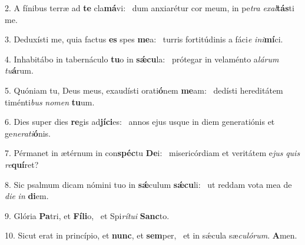 2. A fínibus terræ ad \textbf{te} cla\textbf{má}vi: \ast\  dum anxiarétur cor meum, in pe\textit{tra} \textit{ex}\textit{al}\textbf{tás}ti me.\

3. Deduxísti me, quia factus \textbf{es} spes \textbf{me}a: \ast\  turris fortitúdinis a fáci\textit{e} \textit{in}\textit{i}\textbf{mí}ci.\

4. Inhabitábo in tabernáculo \textbf{tu}o in \textbf{sǽ}\textbf{cu}la: \ast\  prótegar in velaménto a\textit{lá}\textit{rum} \textit{tu}\textbf{á}rum.\

5. Quóniam tu, Deus meus, exaudísti orati\textbf{ó}nem \textbf{me}am: \ast\  dedísti hereditátem timénti\textit{bus} \textit{no}\textit{men} \textbf{tu}um.\

6. Dies super dies \textbf{re}gis ad\textbf{jí}\textbf{ci}es: \ast\  annos ejus usque in diem generatiónis et ge\textit{ne}\textit{ra}\textit{ti}\textbf{ó}nis.\

7. Pérmanet in ætérnum in con\textbf{spéc}tu \textbf{De}i: \ast\  misericórdiam et veritátem e\textit{jus} \textit{quis} \textit{re}\textbf{quí}ret?\

8. Sic psalmum dicam nómini tuo in \textbf{sǽ}culum \textbf{sǽ}\textbf{cu}li: \ast\  ut reddam vota mea de \textit{di}\textit{e} \textit{in} \textbf{di}em.\

9. Glória \textbf{Pa}tri, et \textbf{Fí}\textbf{li}o, \ast\  et Spi\textit{rí}\textit{tu}\textit{i} \textbf{Sanc}to.\

10. Sicut erat in princípio, et \textbf{nunc}, et \textbf{sem}per, \ast\  et in sǽcula sæ\textit{cu}\textit{ló}\textit{rum}. \textbf{A}men.\

